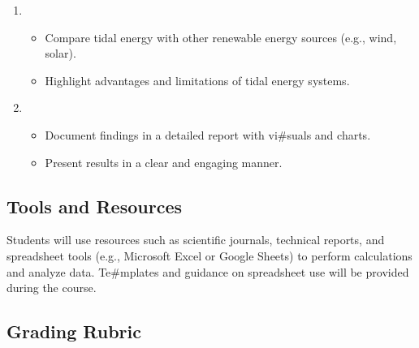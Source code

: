 \documentclass[letterpaper,10pt,english]{jupyterBook}
\begin{document}
\begin{enumerate}
\begin{itemize}
\item {} 
\sphinxAtStartPar
Evaluate possible ecological disruptions and mitigation
strategies.

\item {} 
\sphinxAtStartPar
Perform a cost\sphinxhyphen{}benefit analysis, focusing on capital and
maintenance costs.

\end{itemize}

\item {} 
\sphinxAtStartPar
{}
\begin{itemize}
\item {} 
\sphinxAtStartPar
Compare tidal energy with other renewable energy sources (e.g.,
wind, solar).

\item {} 
\sphinxAtStartPar
Highlight advantages and limitations of tidal energy systems.

\end{itemize}

\item {} 
\sphinxAtStartPar
{}
\begin{itemize}
\item {} 
\sphinxAtStartPar
Document findings in a detailed report with vi\#suals and charts.

\item {} 
\sphinxAtStartPar
Present results in a clear and engaging manner.

\end{itemize}

\end{enumerate}


\subsection{Tools and Resources}
\label{\detokenize{ProjectSyllabus:id15}}
\sphinxAtStartPar
Students will use resources such as scientific journals, technical
reports, and spreadsheet tools (e.g., Microsoft Excel or Google Sheets)
to perform calculations and analyze data. Te\#mplates and guidance on
spreadsheet use will be provided during the course.


\subsection{Grading Rubric}
\label{\detokenize{ProjectSyllabus:id16}}
\end{document}
